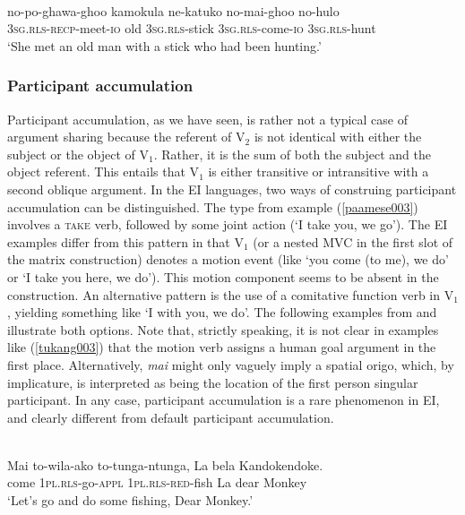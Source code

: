\ea \label{muna0016}
\\
\gll no-po-ghawa-ghoo kamokula ne-katuko no-mai-ghoo no-hulo \\
3\textsc{sg}.\textsc{rls}-\textsc{recp}-meet-\textsc{io} old 3\textsc{sg}.\textsc{rls}-stick 3\textsc{sg}.\textsc{rls}-come-\textsc{io} 3\textsc{sg}.\textsc{rls}-hunt \\
\glft `She met an old man with a stick who had been hunting.'\\ 
\z

\subsubsection{Participant accumulation}

Participant accumulation, as we have seen, is rather not a typical case of argument sharing because the referent of V$_2$ is not identical with either the subject or the object of V$_1$. Rather, it is the sum of both the subject and the object referent. This entails that V$_1$ is either transitive or intransitive with a second oblique argument. In the EI languages, two ways of construing participant accumulation can be distinguished. The  type from example (\ref{paamese003}) involves a \textsc{take} verb, followed by some joint action (`I take you, we go'). The EI examples differ from this pattern in that V$_1$ (or a nested MVC in the first slot of the matrix construction) denotes a motion event (like `you come (to me), we do' or `I take you here, we do'). This motion component seems to be absent in the  construction. An alternative pattern is the use of a comitative function verb in V$_1$, yielding something like `I with you, we do'. The following examples from  and  illustrate both options. Note that, strictly speaking, it is not clear in examples like (\ref{tukang003}) that the motion verb assigns a human goal argument in the first place. Alternatively, \textit{mai} might only vaguely imply a spatial origo, which, by implicature, is interpreted as being the location of the first person singular participant. In any case, participant accumulation is a rare phenomenon in EI, and clearly different from default  participant accumulation.

\ea \label{tukang003}
\\
\gll Mai to-wila-ako to-tunga-ntunga, La bela Kandokendoke. \\
come 1\textsc{pl}.\textsc{rls}-go-\textsc{appl} 1\textsc{pl}.\textsc{rls}-\textsc{red}-fish La dear Monkey \\
\glft `Let's go and do some fishing, Dear Monkey.'\\ 
\z

